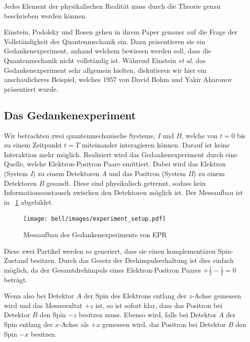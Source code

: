 \begin{refsection}
\begin{definition}\label{def:bell:Vollstaendigkeit}
    Jedes Element der physikalischen Realit\"at muss durch die Theorie
    genau beschrieben werden k\"onnen.
\end{definition}

Einstein, Podolsky und Rosen gehen in ihrem Paper genauer auf die Frage
der Vollst\"andigkeit der Quantenmechanik ein.
Dazu pr\"asentieren sie ein Gedankenexperiment, anhand welchem bewiesen
werden soll, dass die Quantenmechanik nicht vollst\"andig ist.
W\"ahrend Einstein \emph{et al.} das Gedankenexperiment sehr
allgemein hielten, diskutieren wir hier ein anschaulicheres Beispiel, welches
1957 von David Bohm und Yakir Aharonov \cite{Bell:Bohm1957} pr\"asentiert
wurde.

\subsection{Das Gedankenexperiment\label{subsection:bell:epr:idee}}
Wir betrachten zwei quantenmechanische Systeme, \textit{I} und \textit{II},
welche von $t=0$ bis zu einem Zeitpunkt $t=T$ miteinander 
interagieren k\"onnen. Darauf ist keine Interaktion mehr m\"oglich.
Realisiert wird das Gedankenexperiment durch eine Quelle, welche
Elektron-Positron Paare emittiert. 
Dabei wird das Elektron (System \textit{I}) zu einem Detektoren $A$ und das 
Positron (System \textit{II}) zu einem Detektoren $B$ gesandt.
Diese sind physikalisch getrennt, sodass kein Informationsaustausch
zwischen den Detektoren m\"oglich ist.
Der Messaufbau ist in \figurename~\ref{fig:bell:EPR_Messaufbau} abgebildet.

\begin{figure}
    \centering
    \texttt{[image: bell/images/experiment\_setup.pdf]}
    \caption{Messaufbau des Gedankenexperiments von EPR}
    \label{fig:bell:EPR_Messaufbau}
\end{figure}

Diese zwei Partikel werden so generiert, dass sie einen komplement\"aren
Spin-Zustand besitzen. 
Durch das Gesetz der Drehimpulserhaltung
ist dies einfach m\"oglich, da der Gesamtdrehimpuls eines Elektron-Positron 
Paares $+\frac12 - \frac12 = 0$ betr\"agt.

Wenn also bei Detektor $A$ der Spin des Elektrons entlang der $z$-Achse
gemessen wird und das Messresultat $+z$ ist, so ist sofort klar, dass
das Positron bei Detektor $B$ den Spin $-z$ besitzen muss. 
Ebenso wird, falls bei Detektor $A$ der Spin entlang der $x$-Achse als $+x$
gemessen wird, das Positron bei Detektor $B$ den Spin $-x$ besitzen.


\end{refsection}
